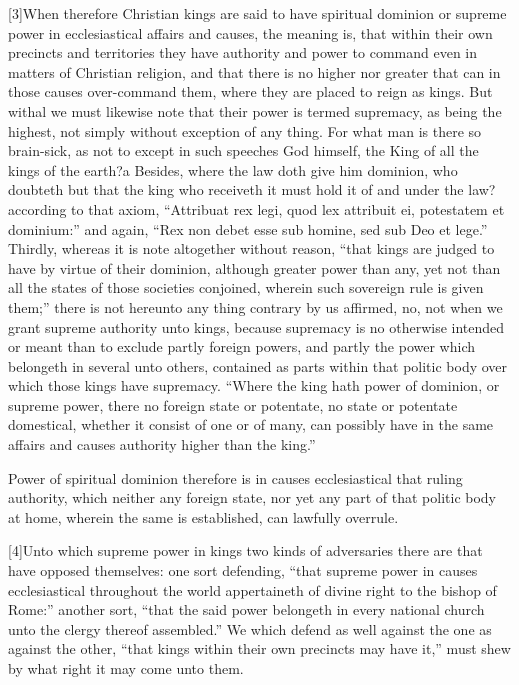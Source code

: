 [3]When therefore Christian kings are said to have spiritual dominion or supreme power in ecclesiastical affairs and causes, the meaning is, that within their own precincts and territories they have authority and power to command even in matters of Christian religion, and that there is no higher nor greater that can in those causes over-command them, where they are placed to reign as kings. But withal we must likewise note that their power is termed supremacy, as being the highest, not simply without exception of any thing. For what man is there so brain-sick, as not to except in such speeches God himself, the King of all the kings of the earth?a Besides, where the law doth give him dominion, who doubteth but that the king who receiveth it must hold it of and under the law? according to that axiom, “Attribuat rex legi, quod lex attribuit ei, potestatem et dominium:” and again, “Rex non debet esse sub homine, sed sub Deo et lege.” Thirdly, whereas it is note altogether  without reason, “that kings are judged to have by virtue of their dominion, although greater power than any, yet not than all the states of those societies conjoined, wherein such sovereign rule is given them;” there is not hereunto any thing contrary by us affirmed, no, not when we grant supreme authority unto kings, because supremacy is no otherwise intended or meant than to exclude partly foreign powers, and partly the power which belongeth in several unto others, contained as parts within that politic body over which those kings have supremacy. “Where the king hath power of dominion, or supreme power, there no foreign state or potentate, no state or potentate domestical, whether it consist of one or of many, can possibly have in the same affairs and causes authority higher than the king.”

Power of spiritual dominion therefore is in causes ecclesiastical that ruling authority, which neither any foreign state, nor yet any part of that politic body at home, wherein the same is established, can lawfully overrule.

[4]Unto which supreme power in kings two kinds of adversaries there are that have opposed themselves: one sort defending, “that supreme power in causes ecclesiastical throughout the world appertaineth of divine right to the bishop of Rome:” another sort, “that the said power belongeth in every national church unto the clergy thereof assembled.” We which defend as well against the one as against the other, “that kings within their own precincts may have it,” must shew by what right it may come unto them.

